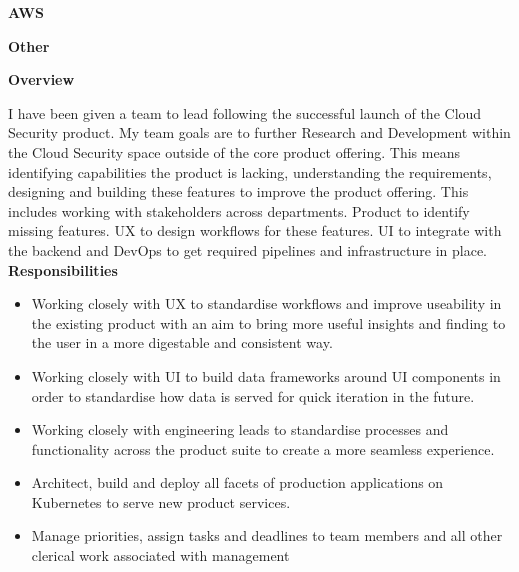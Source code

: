 \documentclass[10pt,a4paper]{altacv}
\begin{document}
\divider 

\textbf{AWS}


\divider

\textbf{Other}


\divider
\textbf{Overview}

I have been given a team to lead following the successful launch of the Cloud Security product. My team goals are to further Research and Development within the Cloud Security space outside of the core product offering. This means identifying capabilities the product is lacking, understanding the requirements, designing and building these features to improve the product offering. This includes working with stakeholders across departments. Product to identify missing features. UX to design workflows for these features. UI to integrate with the backend and DevOps to get required pipelines and infrastructure in place.   
\newline
\newline
\textbf{Responsibilities}
\begin{itemize}
  \item Working closely with UX to standardise workflows and improve useability in the existing product with an aim to bring more useful insights and finding to the user in a more digestable and consistent way.
  \item Working closely with UI to build data frameworks around UI components in order to standardise how data is served for quick iteration in the future. 
  \item Working closely with engineering leads to standardise processes and functionality across the product suite to create a more seamless experience.
  \item Architect, build and deploy all facets of production applications on Kubernetes to serve new product services.
  \item Manage priorities, assign tasks and deadlines to team members and all other clerical work associated with management
\end{itemize}

\newpage

\end{document}
